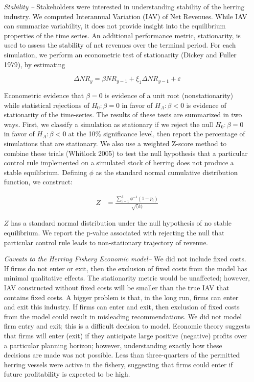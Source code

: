 \documentclass[]{article}
\begin{document}
\emph{Stability --} Stakeholders were interested in understanding
stability of the herring industry. We computed Interannual Variation
(IAV) of Net Revenues. While IAV can summarize variability, it does not
provide insight into the equilibrium properties of the time series. An
additional performance metric, stationarity, is used to assess the
stability of net revenues over the terminal period. For each simulation,
we perform an econometric test of stationarity (Dickey and Fuller 1979),
by estimating

\begin{equation}
\label{DF_estimated}
\Delta NR_{y} = \beta  NR_{y-1} + \xi_1 \Delta NR_{y-1} + \varepsilon 
\end{equation}

Econometric evidence that \(\beta=0\) is evidence of a unit root
(nonstationarity) while statistical rejections of \(H_0: \beta=0\) in
favor of \(H_A: \beta<0\) is evidence of stationarity of the
time-series. The results of these tests are summarized in two ways.
First, we classify a simulation as stationary if we reject the null
\(H_0: \beta=0\) in favor of \(H_A: \beta<0\) at the 10\% significance
level, then report the percentage of simulations that are stationary. We
also use a weighted Z-score method to combine these trials (Whitlock
2005) to test the null hypothesis that a particular control rule
implemented on a simulated stock of herring does not produce a stable
equilibrium. Defining \(\phi\) as the standard normal cumulative
distribution function, we construct:

\begin{align}
Z  &= \frac{\sum_{i=1}^k \phi^{-1} (1-p_i)}{\sqrt(k)}
\end{align}

\(Z\) has a standard normal distribution under the null hypothesis of no
stable equilibrium. We report the p-value associated with rejecting the
null that particular control rule leads to non-stationary trajectory of
revenue.

\emph{Caveats to the Herring Fishery Economic model--} We did not
include fixed costs. If firms do not enter or exit, then the exclusion
of fixed costs from the model has minimal qualitative effects. The
stationarity metric would be unaffected; however, IAV constructed
without fixed costs will be smaller than the true IAV that contains
fixed costs. A bigger problem is that, in the long run, firms can enter
and exit this industry. If firms can enter and exit, then exclusion of
fixed costs from the model could result in misleading recommendations.
We did not model firm entry and exit; this is a difficult decision to
model. Economic theory suggests that firms will enter (exit) if they
anticipate large positive (negative) profits over a particular planning
horizon; however, understanding exactly how these decisions are made was
not possible. Less than three-quarters of the permitted herring vessels
were active in the fishery, suggesting that firms could enter if future
profitability is expected to be high.
\end{document}
